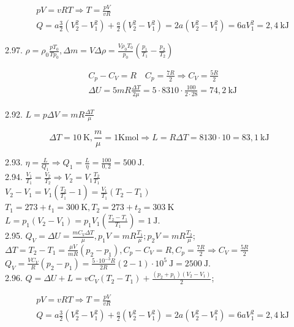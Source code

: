 \documentclass[10pt]{article}
\begin{document}
$$
\begin{aligned}
& p V=v R T \Rightarrow T=\frac{p V}{v R} \\
& Q=a \frac{3}{2}\left(V_{2}^{2}-V_{1}^{2}\right)+\frac{a}{2}\left(V_{2}^{2}-V_{1}^{2}\right)=2 a\left(V_{2}^{2}-V_{1}^{2}\right)=6 a V_{1}^{2}=2,4 \mathrm{~kJ}
\end{aligned}
$$

2.97. $\rho=\rho_{0} \frac{p T_{0}}{T p_{0}}, \Delta m=V \Delta \rho=\frac{V \rho_{0} T_{0}}{p_{0}}\left(\frac{p_{1}}{T_{1}}-\frac{p_{2}}{T_{2}}\right)$

$$
\begin{aligned}
& C_{p}-C_{V}=R \quad C_{p}=\frac{7 R}{2} \Rightarrow C_{V}=\frac{5 R}{2} \\
& \Delta U=5 m R \frac{\Delta T}{2 \mu}=5 \cdot 8310 \cdot \frac{100}{2 \cdot 28}=74,2 \mathrm{~kJ}
\end{aligned}
$$

2.92. $L=p \Delta V=m R \frac{\Delta T}{\mu}$

$$
\Delta T=10 \mathrm{~K}, \frac{m}{\mu}=1 \mathrm{Kmol} \Rightarrow L=R \Delta T=8130 \cdot 10=83,1 \mathrm{~kJ}
$$

2.93. $\eta=\frac{L}{Q_{1}} \Rightarrow Q_{1}=\frac{L}{\eta}=\frac{100}{0,2}=500 \mathrm{~J}$.\\
2.94. $\frac{V_{1}}{T_{1}}=\frac{V_{2}}{T_{2}} \Rightarrow V_{2}=V_{1} \frac{T_{2}}{T_{1}}$\\
$V_{2}-V_{1}=V_{1}\left(\frac{T_{2}}{T_{1}}-1\right)=\frac{V_{1}}{T_{1}}\left(T_{2}-T_{1}\right)$\\
$T_{1}=273+t_{1}=300 \mathrm{~K}, T_{2}=273+t_{2}=303 \mathrm{~K}$\\
$L=p_{1}\left(V_{2}-V_{1}\right)=p_{1} V_{1}\left(\frac{T_{2}-T_{1}}{T_{1}}\right)=1 \mathrm{~J}$.\\
2.95. $Q_{V}=\Delta U=\frac{m C_{V} \Delta T}{\mu}, p_{1} V=m R \frac{T_{1}}{\mu} ; p_{2} V=m R \frac{T_{2}}{\mu}$;\\
$\Delta T=T_{2}-T_{1}=\frac{\mu V}{m R}\left(p_{2}-p_{1}\right), C_{p}-C_{V}=R, C_{p}=\frac{7 R}{2} \Rightarrow C_{V}=\frac{5 R}{2}$\\
$Q_{V}=\frac{V C_{V}}{R}\left(p_{2}-p_{1}\right)=\frac{5 \cdot 10^{-3} R}{2 R}(2-1) \cdot 10^{5} \mathrm{~J}=2500 \mathrm{~J}$.\\
2.96. $Q=\Delta U+L=v C_{V}\left(T_{2}-T_{1}\right)+\frac{\left(p_{2}+p_{1}\right)\left(V_{2}-V_{1}\right)}{2}$;

$$
\begin{aligned}
& p V=v R T \Rightarrow T=\frac{p V}{v R} \\
& Q=a \frac{3}{2}\left(V_{2}^{2}-V_{1}^{2}\right)+\frac{a}{2}\left(V_{2}^{2}-V_{1}^{2}\right)=2 a\left(V_{2}^{2}-V_{1}^{2}\right)=6 a V_{1}^{2}=2,4 \mathrm{~kJ}
\end{aligned}
$$
\end{document}
